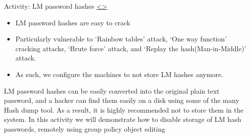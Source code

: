 \documentclass[12pt]{extarticle}
\newenvironment{instructionblock}{\Large\bgroup}{\egroup}
\begin{document}
\pagebreak
\begin{slide}{ Activity: LM password hashes  }{\hyperref[slide 16]{\textless}\hyperref[slide 18]{\textgreater}}
	\vskip 5pt
	\begin{instructionblock}
		\begin{itemize}
			\item LM password hashes are easy to crack
			\item Particularly vulnerable to `Rainbow tables' attack, `One way function' cracking attacks, `Brute force' attack, and `Replay the hash(Man-in-Middle)' attack.
			\item As such, we configure the machines to not store LM hashes anymore.
		\end{itemize}
	\end{instructionblock}
\end{slide}


\vspace{2mm}
\noindent
LM password hashes can be easily converted into the original plain text password, and a hacker can find them easily on a disk using some of the many Hash dump tool. As a result, it is highly recommended not to store them in the system. In this activity we will demonstrate how to disable storage of LM hash passwords, remotely using group policy object editing\\
\end{document}
